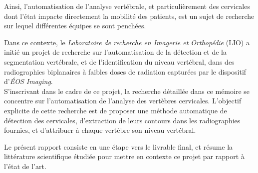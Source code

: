 Ainsi, l'automatisation de l'analyse vertébrale, et particulièrement des cervicales dont l'état impacte directement la mobilité des patients, est un sujet de recherche sur lequel différentes équipes se sont penchées.

Dans ce contexte, le {\itshape Laboratoire de recherche en Imagerie et Orthopédie} (LIO) a initié un projet de recherche sur l'automatisation de la détection et de la segmentation vertébrale, et de l'identification du niveau vertébral, dans des radiographies biplanaires à faibles doses de radiation capturées par le dispositif d'{\itshape ÉOS Imaging\textregistered}.
\\

S'inscrivant dans le cadre de ce projet, la recherche détaillée dans ce mémoire se concentre sur l'automatisation de l'analyse des vertèbres cervicales. L'objectif explicite de cette recherche est de proposer une méthode automatique de détection des cervicales, d'extraction de leurs contours dans les radiographies fournies, et d'attribuer à chaque vertèbre son niveau vertébral.

Le présent rapport consiste en une étape vers le livrable final, et résume la littérature scientifique étudiée pour mettre en contexte ce projet par rapport à l'état de l'art.
